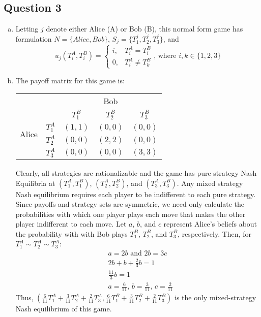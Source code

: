 \documentclass{article}
\begin{document}

\subsection*{Question 3}

\begin{enumerate}[(a)]
	\item Letting $j$ denote either Alice (A) or Bob (B), this normal form game has formulation ${N=\{Alice,Bob\}}$, ${S_j=\{T^j_1,T^j_2,T^j_3\}}$, and 
		\[
			u_j(T_i^A,T_i^B) = \begin{cases} i, &T_i^A = T_i^B	\\ 0, &T^A_i\neq T^B_k\end{cases}\text{, where }i,k\in\{1,2,3\}
		\]
	
	\item The payoff matrix for this game is:
		\begin{center}
			\begin{tabular}{crccc}
			&					& \multicolumn{3}{c}{Bob}													\\
			&					& $T^B_1$						& $T^B_2$						& $T^B_3$				\\ \cline{3-5} 
			\multirow{2}{*}{Alice}						
			& $T^A_1$			& \multicolumn{1}{|c|}{$(1,1)$}	& \multicolumn{1}{|c|}{$(0,0)$}	& \multicolumn{1}{|c|}{$(0,0)$}	\\ \cline{3-5}
			& $T^A_2$			& \multicolumn{1}{|c|}{$(0,0)$}	& \multicolumn{1}{|c|}{$(2,2)$}	& \multicolumn{1}{|c|}{$(0,0)$}	\\ \cline{3-5}
			& $T^A_3$			& \multicolumn{1}{|c|}{$(0,0)$}	& \multicolumn{1}{|c|}{$(0,0)$}	& \multicolumn{1}{|c|}{$(3,3)$}	\\ \cline{3-5}
			\end{tabular}
		\end{center}
		Clearly, all strategies are rationalizable and the game has pure strategy Nash Equilibria at ${(T^A_1,T^B_1)}$, ${(T^A_2,T^B_2)}$, and ${(T^A_3,T^B_3)}$. Any mixed strategy Nash equilibrium requires each player to be indifferent to each pure strategy. Since payoffs and strategy sets are symmetric, we need only calculate the probabilities with which one player plays each move that makes the other player indifferent to each move. Let $a$, $b$, and $c$ represent Alice's beliefs about the probability with with Bob plays  $T^B_1$, $T^B_2$, and $T^B_3$, respectively. Then, for  ${T^A_1\sim T^A_2\sim T^A_3}$:
		\begin{align*}
			&a=2b\text{ and }2b=3c	\\
			&2b + b + \frac{2}{3}b = 1	\\
			&\frac{11}{3}b = 1			\\
			&a=\frac{6}{11}\text{, }b = \frac{3}{11}\text{, }c = \frac{2}{11}
		\end{align*}
		Thus, ${\left(\frac{6}{11}T^A_1 + \frac{3}{11}T^A_2 + \frac{2}{11}T^A_3,\frac{6}{11}T^B_1 + \frac{3}{11}T^B_2 + \frac{2}{11}T^B_3\right)}$ is the only mixed-strategy Nash equilibrium of this game.
\end{enumerate}
\end{document}
